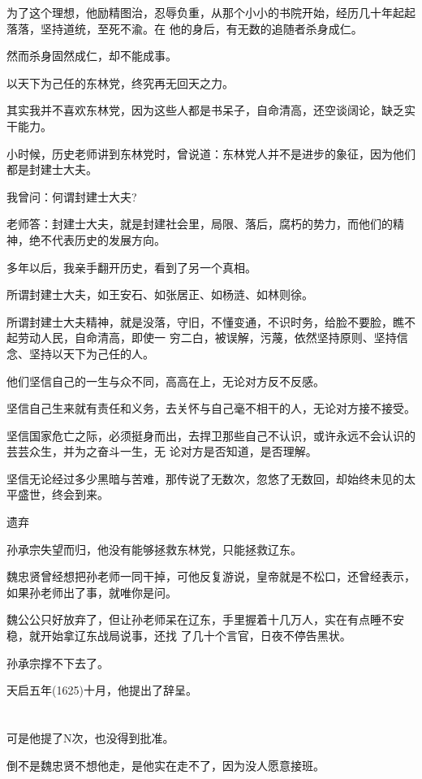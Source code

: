 \documentclass[11pt,a4paper,onecolumn]{article}
\begin{document}
为了这个理想，他励精图治，忍辱负重，从那个小小的书院开始，经历几十年起起落落，坚持道统，至死不渝。在
他的身后，有无数的追随者杀身成仁。

然而杀身固然成仁，却不能成事。

以天下为己任的东林党，终究再无回天之力。

其实我并不喜欢东林党，因为这些人都是书呆子，自命清高，还空谈阔论，缺乏实干能力。

小时候，历史老师讲到东林党时，曾说道：东林党人并不是进步的象征，因为他们都是封建士大夫。

我曾问：何谓封建士大夫?

老师答：封建士大夫，就是封建社会里，局限、落后，腐朽的势力，而他们的精神，绝不代表历史的发展方向。

多年以后，我亲手翻开历史，看到了另一个真相。

所谓封建士大夫，如王安石、如张居正、如杨涟、如林则徐。

所谓封建士大夫精神，就是没落，守旧，不懂变通，不识时务，给脸不要脸，瞧不起劳动人民，自命清高，即使一
穷二白，被误解，污蔑，依然坚持原则、坚持信念、坚持以天下为己任的人。

他们坚信自己的一生与众不同，高高在上，无论对方反不反感。

坚信自己生来就有责任和义务，去关怀与自己毫不相干的人，无论对方接不接受。

坚信国家危亡之际，必须挺身而出，去捍卫那些自己不认识，或许永远不会认识的芸芸众生，并为之奋斗一生，无
论对方是否知道，是否理解。

坚信无论经过多少黑暗与苦难，那传说了无数次，忽悠了无数回，却始终未见的太平盛世，终会到来。

遗弃

孙承宗失望而归，他没有能够拯救东林党，只能拯救辽东。

魏忠贤曾经想把孙老师一同干掉，可他反复游说，皇帝就是不松口，还曾经表示，如果孙老师出了事，就唯你是问。

魏公公只好放弃了，但让孙老师呆在辽东，手里握着十几万人，实在有点睡不安稳，就开始拿辽东战局说事，还找
了几十个言官，日夜不停告黑状。

孙承宗撑不下去了。

天启五年(1625)十月，他提出了辞呈。

\section[\thesection]{}

可是他提了N次，也没得到批准。

倒不是魏忠贤不想他走，是他实在走不了，因为没人愿意接班。
\end{document}
